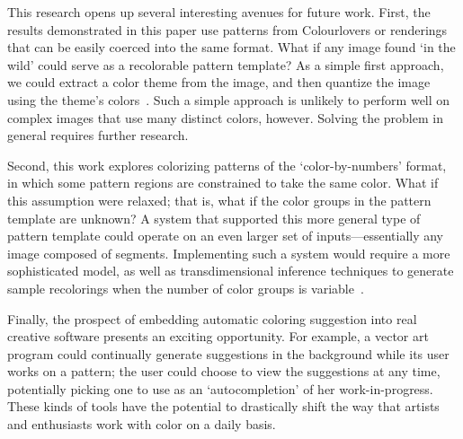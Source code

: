 This research opens up several interesting avenues for future work.
First, the results demonstrated in this paper use patterns from Colourlovers or renderings that can be easily coerced into the same format. What if any image found `in the wild' could serve as a recolorable pattern template? As a simple first approach, we could extract a color theme from the image, and then quantize the image using the theme's colors~\cite{SharonPaletteExtraction}. Such a simple approach is unlikely to perform well on complex images that use many distinct colors, however. Solving the problem in general requires further research.

Second, this work explores colorizing patterns of the `color-by-numbers' format, in which some pattern regions are constrained to take the same color. What if this assumption were relaxed; that is, what if the color groups in the pattern template are unknown? A system that supported this more general type of pattern template could operate on an even larger set of inputs---essentially any image composed of segments. Implementing such a system would require a more sophisticated model, as well as transdimensional inference techniques to generate sample recolorings when the number of color groups is variable~\cite{ReversibleJumpMCMC}.

Finally, the prospect of embedding automatic coloring suggestion into real creative software presents an exciting opportunity. For example, a vector art program could continually generate suggestions in the background while its user works on a pattern; the user could choose to view the suggestions at any time, potentially picking one to use as an `autocompletion' of her work-in-progress. These kinds of tools have the potential to drastically shift the way that artists and enthusiasts work with color on a daily basis. 

